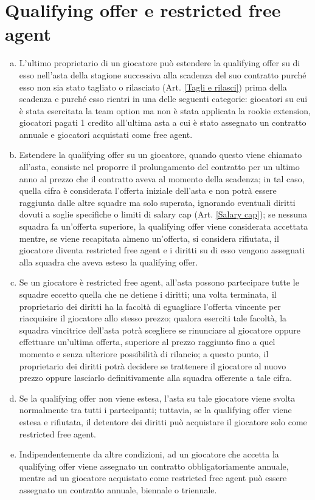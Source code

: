 \documentclass{article}
\begin{document}
\section{Qualifying offer e restricted free agent}\label{Qualifying offer e restricted free agent}
\begin{enumerate}[(a)]
\item L'ultimo proprietario di un giocatore può estendere la qualifying offer su di esso nell'asta della stagione successiva alla scadenza del suo contratto purché esso non sia stato tagliato o rilasciato (Art. \ref{Tagli e rilasci}) prima della scadenza e purché esso rientri in una delle seguenti categorie: giocatori su cui è stata esercitata la team option ma non è stata applicata la rookie extension, giocatori pagati 1 credito all'ultima asta a cui è stato assegnato un contratto annuale e giocatori acquistati come free agent.
\item Estendere la qualifying offer su un giocatore, quando questo viene chiamato all'asta, consiste nel proporre il prolungamento del contratto per un ultimo anno al prezzo che il contratto aveva al momento della scadenza; in tal caso, quella cifra è considerata l'offerta iniziale dell'asta e non potrà essere raggiunta dalle altre squadre ma solo superata, ignorando eventuali diritti dovuti a soglie specifiche o limiti di salary cap (Art. \ref{Salary cap}); se nessuna squadra fa un'offerta superiore, la qualifying offer viene considerata accettata mentre, se viene recapitata almeno un'offerta, si considera rifiutata, il giocatore diventa restricted free agent e i diritti su di esso vengono assegnati alla squadra che aveva esteso la qualifying offer.
\item Se un giocatore è restricted free agent, all'asta possono partecipare tutte le squadre eccetto quella che ne detiene i diritti; una volta terminata, il proprietario dei diritti ha la facoltà di eguagliare l'offerta vincente per riacquisire il giocatore allo stesso prezzo; qualora eserciti tale facoltà, la squadra vincitrice dell'asta potrà scegliere se rinunciare al giocatore oppure effettuare un'ultima offerta, superiore al prezzo raggiunto fino a quel momento e senza ulteriore possibilità di rilancio; a questo punto, il proprietario dei diritti potrà decidere se trattenere il giocatore al nuovo prezzo oppure lasciarlo definitivamente alla squadra offerente a tale cifra.
\item Se la qualifying offer non viene estesa, l'asta su tale giocatore viene svolta normalmente tra tutti i partecipanti; tuttavia, se la qualifying offer viene estesa e rifiutata, il detentore dei diritti può acquistare il giocatore solo come restricted free agent.
\item Indipendentemente da altre condizioni, ad un giocatore che accetta la qualifying offer viene assegnato un contratto obbligatoriamente annuale, mentre ad un giocatore acquistato come restricted free agent può essere assegnato un contratto annuale, biennale o triennale.
\end{enumerate}
\end{document}
